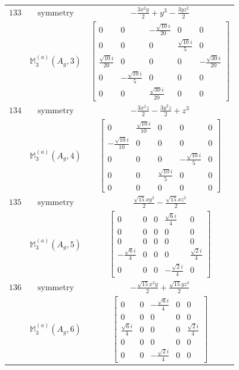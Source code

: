\documentclass[fleqn,8pt,landscape]{jsarticle}
\begin{document}
\begin{longtable}{ccc}
$ 133 $ & $ \text{symmetry} $ & $ - \frac{3 x^{2} y}{2} + y^{3} - \frac{3 y z^{2}}{2} $ \\
$  $ & $ \mathbb{M}_{3}^{(a)}(A_{g},3) $ & $ \begin{bmatrix} 0 & 0 & - \frac{\sqrt{10} i}{20} & 0 & 0 \\ 0 & 0 & 0 & \frac{\sqrt{10} i}{5} & 0 \\ \frac{\sqrt{10} i}{20} & 0 & 0 & 0 & - \frac{\sqrt{30} i}{20} \\ 0 & - \frac{\sqrt{10} i}{5} & 0 & 0 & 0 \\ 0 & 0 & \frac{\sqrt{30} i}{20} & 0 & 0 \end{bmatrix} $ \\ \hline
$ 134 $ & $ \text{symmetry} $ & $ - \frac{3 x^{2} z}{2} - \frac{3 y^{2} z}{2} + z^{3} $ \\
$  $ & $ \mathbb{M}_{3}^{(a)}(A_{g},4) $ & $ \begin{bmatrix} 0 & \frac{\sqrt{10} i}{10} & 0 & 0 & 0 \\ - \frac{\sqrt{10} i}{10} & 0 & 0 & 0 & 0 \\ 0 & 0 & 0 & - \frac{\sqrt{10} i}{5} & 0 \\ 0 & 0 & \frac{\sqrt{10} i}{5} & 0 & 0 \\ 0 & 0 & 0 & 0 & 0 \end{bmatrix} $ \\ \hline
$ 135 $ & $ \text{symmetry} $ & $ \frac{\sqrt{15} x y^{2}}{2} - \frac{\sqrt{15} x z^{2}}{2} $ \\
$  $ & $ \mathbb{M}_{3}^{(a)}(A_{g},5) $ & $ \begin{bmatrix} 0 & 0 & 0 & \frac{\sqrt{6} i}{4} & 0 \\ 0 & 0 & 0 & 0 & 0 \\ 0 & 0 & 0 & 0 & 0 \\ - \frac{\sqrt{6} i}{4} & 0 & 0 & 0 & \frac{\sqrt{2} i}{4} \\ 0 & 0 & 0 & - \frac{\sqrt{2} i}{4} & 0 \end{bmatrix} $ \\ \hline
$ 136 $ & $ \text{symmetry} $ & $ - \frac{\sqrt{15} x^{2} y}{2} + \frac{\sqrt{15} y z^{2}}{2} $ \\
$  $ & $ \mathbb{M}_{3}^{(a)}(A_{g},6) $ & $ \begin{bmatrix} 0 & 0 & - \frac{\sqrt{6} i}{4} & 0 & 0 \\ 0 & 0 & 0 & 0 & 0 \\ \frac{\sqrt{6} i}{4} & 0 & 0 & 0 & \frac{\sqrt{2} i}{4} \\ 0 & 0 & 0 & 0 & 0 \\ 0 & 0 & - \frac{\sqrt{2} i}{4} & 0 & 0 \end{bmatrix} $ \\ \hline

\end{longtable}
\end{document}
